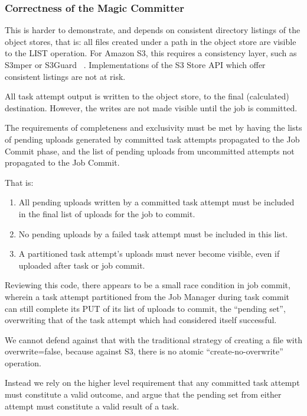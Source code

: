 \documentclass[format=acmsmall, screen=true, review=false]{acmart}
\begin{document}
\subsubsection{Correctness of the Magic Committer}

This is harder to demonstrate, and depends on consistent directory
listings of the object stores, that is: all files created under a path
in the object store are visible to the LIST operation.
For Amazon S3, this requires a consistency layer, such as S3mper or S3Guard
\ \cite{S3mper,HADOOP-13345}.
Implementations of the S3 Store API which offer consistent listings are not
at risk.

All task attempt output is written to the object store, to the final (calculated)
destination.
However, the writes are not made visible until the job is committed.

The requirements of completeness and exclusivity must be met by
having the lists of pending uploads generated by committed task attempts propagated
to the Job Commit phase, and the list of pending uploads from uncommitted
attempts not propagated to the Job Commit.

That is:

\begin{enumerate}
  \item All pending uploads written by a committed task attempt must be
  included in the final list of uploads for the job to commit.
  \item No pending uploads by a failed task attempt must be included in this list.
  \item A partitioned task attempt's uploads must never become visible,
  even if uploaded after task or job commit.
\end{enumerate}


Reviewing this code, there appears to be a small race condition in job commit,
wherein a task attempt partitioned from the Job Manager during task commit
can still complete its PUT of its list of uploads to commit, the ``pending set'',
overwriting that of the task attempt which had considered itself successful.

We cannot defend against that with the traditional strategy of creating
a file with overwrite=false, because against S3, there is no atomic
``create-no-overwrite'' operation.

Instead we rely on the higher level requirement that any committed task attempt must
constitute a valid outcome, and argue that the pending set from either attempt
must constitute a valid result of a task.
\end{document}
